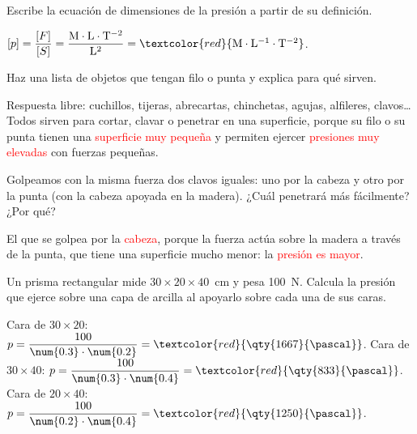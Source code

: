 \begin{exercise}
    Escribe la ecuación de dimensiones de la presión a partir de su definición.
    \begin{solu}
        \([p] = \dfrac{[F]}{[S]} = \dfrac{\mathrm{M \cdot L \cdot T^{-2}}}{\mathrm{L^2}} = \textcolor{red}{\mathrm{M \cdot L^{-1} \cdot T^{-2}}}\).
    \end{solu}
\end{exercise}

\begin{exercise}
    Haz una lista de objetos que tengan filo o punta y explica para qué sirven.
    \begin{solu}
        Respuesta libre: cuchillos, tijeras, abrecartas, chinchetas, agujas, alfileres, clavos\ldots{} Todos sirven para cortar, clavar o penetrar en una superficie, porque su filo o su punta tienen una \textcolor{red}{superficie muy pequeña} y permiten ejercer \textcolor{red}{presiones muy elevadas} con fuerzas pequeñas.
    \end{solu}
\end{exercise}

\begin{exercise}
    Golpeamos con la misma fuerza dos clavos iguales: uno por la cabeza y otro por la punta (con la cabeza apoyada en la madera). ¿Cuál penetrará más fácilmente? ¿Por qué?
    \begin{solu}
        El que se golpea por la \textcolor{red}{cabeza}, porque la fuerza actúa sobre la madera a través de la punta, que tiene una superficie mucho menor: la \textcolor{red}{presión es mayor}.
    \end{solu}
\end{exercise}

\begin{exercise}
    Un prisma rectangular mide \(30 \times 20 \times 40\)~\unit{\cm} y pesa \qty{100}{\newton}. Calcula la presión que ejerce sobre una capa de arcilla al apoyarlo sobre cada una de sus caras.
    \begin{solu}
        Cara de \(30 \times 20\): \(p = \dfrac{100}{\num{0.3} \cdot \num{0.2}} = \textcolor{red}{\qty{1667}{\pascal}}\).
        Cara de \(30 \times 40\): \(p = \dfrac{100}{\num{0.3} \cdot \num{0.4}} = \textcolor{red}{\qty{833}{\pascal}}\).
        Cara de \(20 \times 40\): \(p = \dfrac{100}{\num{0.2} \cdot \num{0.4}} = \textcolor{red}{\qty{1250}{\pascal}}\).
    \end{solu}
\end{exercise}

